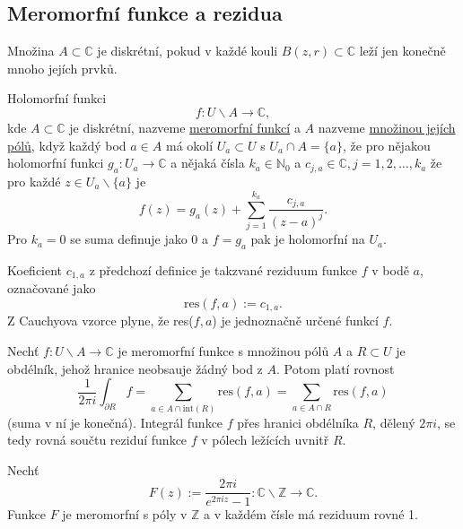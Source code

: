 \documentclass[../main.tex]{subfiles}
\begin{document}
\subsection{Meromorfní funkce a rezidua}

\begin{definition}
    Množina $A\subset \mathbb{C}$ je diskrétní, pokud v každé
    kouli $B(z,r)\subset \mathbb{C}$ leží jen konečně mnoho jejích prvků.
\end{definition}

\begin{definition}
    Holomorfní funkci \[ f: U\backslash A \to \mathbb{C}, \]
    kde $A\subset \mathbb{C}$ je diskrétní, nazveme \underline{meromorfní funkcí} a
    $A$ nazveme \underline{množinou jejích pólů}, když každý bod 
    $a \in A$ má okolí $U_a \subset U$ s $U_a \cap A = \{a\}$, že pro
    nějakou holomorfní funkci $g_a:U_a \to \mathbb{C}$ a nějaká
    čísla $k_a \in \mathbb{N}_0$ a $c_{j,a} \in\mathbb{C}, j = 1,2,\dots,k_a$ že pro každé
    $z \in U_a\backslash \{a\}$ je
    \[ f(z) = g_a(z) + \sum_{j=1}^{k_a} \frac{c_{j,a}}{(z-a)^j}. \]
    Pro $k_a = 0$ se suma definuje jako 0 a $f = g_a$ pak je holomorfní na $U_a$.
\end{definition}

\begin{definition}
    Koeficient $c_{1,a}$ z předchozí definice je takzvané reziduum funkce $f$ v bodě $a$,
    označované jako \[ \text{res}(f,a) := c_{1,a}. \]
    Z Cauchyova vzorce plyne, že res($f,a$) je jednoznačně určené funkcí $f$.
\end{definition}

\begin{theorem}[Reziduová]
    Nechť $f:U\backslash A\to\mathbb{C}$ je meromorfní funkce s množinou pólů $A$ a $R\subset U$ je obdélník,
    jehož hranice neobsauje žádný bod z $A$. Potom platí rovnost
    \[ \frac{1}{2\pi i}\int_{\partial R}f = \sum_{a\in A\cap\text{int}(R)} \text{res}(f,a) = \sum_{a\in A\cap R} \text{res}(f,a) \]
    (suma v ní je konečná). Integrál funkce $f$ přes hranici obdélníka $R$, dělený $2\pi i$, se tedy rovná součtu reziduí funkce $f$ v pólech ležících
    uvnitř $R$.
\end{theorem}

\begin{lemma}[O funkci $F(z)$]
    Nechť \[ F(z) := \frac{2\pi i}{e^{2\pi iz} - 1}: \mathbb{C} \backslash \mathbb{Z} \to \mathbb{C}. \]
    Funkce $F$ je meromorfní s póly v $\mathbb{Z}$ a v každém čísle má reziduum rovné 1.
\end{lemma}
\end{document}
